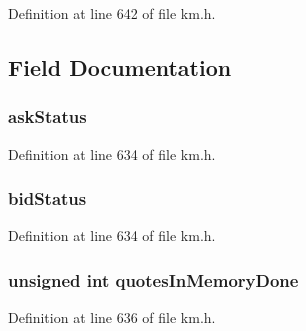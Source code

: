 Definition at line 642 of file km.\+h.



\subsection{Field Documentation}
\subsubsection[{\texorpdfstring{ask\+Status}{askStatus}}]{ ask\+Status}\hypertarget{struct_k_1_1m_quote_status_a337d23be0a3a24d260917d7237ab226c}{}\label{struct_k_1_1m_quote_status_a337d23be0a3a24d260917d7237ab226c}


Definition at line 634 of file km.\+h.

\subsubsection[{\texorpdfstring{bid\+Status}{bidStatus}}]{ bid\+Status}\hypertarget{struct_k_1_1m_quote_status_a32c042e88ff93f679a53d90d8c5f0f4a}{}\label{struct_k_1_1m_quote_status_a32c042e88ff93f679a53d90d8c5f0f4a}


Definition at line 634 of file km.\+h.

\subsubsection[{\texorpdfstring{quotes\+In\+Memory\+Done}{quotesInMemoryDone}}]{\setlength{\rightskip}{0pt plus 5cm}unsigned int quotes\+In\+Memory\+Done}\hypertarget{struct_k_1_1m_quote_status_a6aaa53c58be053ff456a485a904539e4}{}\label{struct_k_1_1m_quote_status_a6aaa53c58be053ff456a485a904539e4}


Definition at line 636 of file km.\+h.

